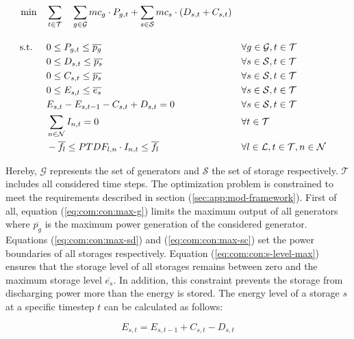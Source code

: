 \begin{subequations}
	\begin{align}
		 \min \quad & \sum_{t\in\mathcal{T}} \quad \sum_{g\in\mathcal{G}}mc_g \cdot P_{g,t} + \sum_{s\in\mathcal{S}}mc_s \cdot (D_{s,t}+C_{s,t})\\[10pt]
		 \text{s.t. } \quad & 0 \leq P_{g,t} \leq \overline{p_g} && \forall g \in \mathcal{G}, t \in \mathcal{T} \label{eq:com:con:max-g}\\
		 & 0 \leq D_{s,t} \leq \overline{p_s} && \forall s \in \mathcal{S}, t \in \mathcal{T} \label{eq:com:con:max-sd}\\
		 & 0 \leq C_{s,t} \leq \overline{p_s} && \forall s \in \mathcal{S}, t \in \mathcal{T} \label{eq:com:con:max-sc}\\
		 & 0 \leq E_{s,t} \leq \overline{e_s} && \forall s \in \mathcal{S}, t \in \mathcal{T} \label{eq:com:con:s-level-max}\\
		 & E_{s,t} - E_{s,t-1} - C_{s,t} + D_{s,t} = 0 && \forall s \in \mathcal{S}, t \in \mathcal{T} \label{eq:com:con:s-level}\\
		 & \sum_{n \in \mathcal{N}} I_{n,t} = 0 && \forall t \in \mathcal{T} \label{eq:com:con:eb}\\
		 & -\overline{f_l} \leq PTDF_{l,n} \cdot I_{n,t} \leq \overline{f_l} && \forall l \in \mathcal{L}, t \in \mathcal{T}, n \in \mathcal{N} \label{eq:com:con:pf}
	\end{align}
\end{subequations}

Hereby, $\mathcal{G}$ represents the set of generators and $\mathcal{S}$ the set of storage respectively. $\mathcal{T}$ includes all considered time steps. The optimization problem is constrained to meet the requirements described in section (\ref{sec:app:mod-framework}). First of all, equation (\ref{eq:com:con:max-g}) limits the maximum output of all generators where $\overline{p_g}$ is the maximum power generation of the considered generator. Equations (\ref{eq:com:con:max-sd}) and (\ref{eq:com:con:max-sc}) set the power boundaries of all storages respectively. Equation (\ref{eq:com:con:s-level-max}) ensures that the storage level of all storages remains between zero and the maximum storage level $\overline{e_s}$. In addition, this constraint prevents the storage from discharging power more than the energy is stored. The energy level of a storage $s$ at a specific timestep $t$ can be calculated as follows:

\begin{equation}
	\label{eq:storage-level}
	E_{s,t} = E_{s,t-1} + C_{s,t} - D_{s,t}
\end{equation}

